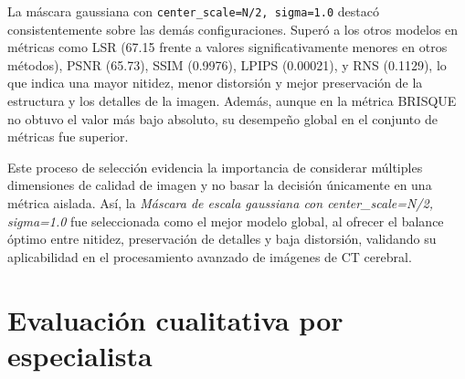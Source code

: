 La máscara gaussiana con \texttt{center\_scale=N/2, sigma=1.0} destacó consistentemente sobre las demás configuraciones. Superó a los otros modelos en métricas como LSR (67.15 frente a valores significativamente menores en otros métodos), PSNR (65.73), SSIM (0.9976), LPIPS (0.00021), y RNS (0.1129), lo que indica una mayor nitidez, menor distorsión y mejor preservación de la estructura y los detalles de la imagen. Además, aunque en la métrica BRISQUE no obtuvo el valor más bajo absoluto, su desempeño global en el conjunto de métricas fue superior.

Este proceso de selección evidencia la importancia de considerar múltiples dimensiones de calidad de imagen y no basar la decisión únicamente en una métrica aislada. Así, la \textit{Máscara de escala gaussiana con center\_scale=N/2, sigma=1.0} fue seleccionada como el mejor modelo global, al ofrecer el balance óptimo entre nitidez, preservación de detalles y baja distorsión, validando su aplicabilidad en el procesamiento avanzado de imágenes de CT cerebral.

\begin{table}[H]
\centering
\caption{Comparativa de métricas para los mejores modelos de cada categoría}
\label{tab:comparativa_final}
\end{table}

\section{Evaluación cualitativa por especialista}

